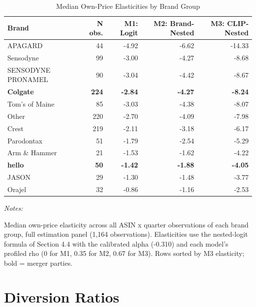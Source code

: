 \begin{table}[H]
\centering
\caption{\label{tab:table_brand_elas}Median Own-Price Elasticities by Brand Group}
\centering
\fontsize{9}{11}\selectfont
\begin{threeparttable}
\begin{tabular}[t]{lrrrr}
\toprule
Brand & N obs. & M1: Logit & M2: Brand-Nested & M3: CLIP-Nested\\
\midrule
APAGARD & 44 & -4.92 & -6.62 & -14.33\\
Sensodyne & 99 & -3.00 & -4.27 & -8.68\\
SENSODYNE PRONAMEL & 90 & -3.04 & -4.42 & -8.67\\
\textbf{Colgate} & \textbf{224} & \textbf{-2.84} & \textbf{-4.27} & \textbf{-8.24}\\
Tom's of Maine & 85 & -3.03 & -4.38 & -8.07\\
\addlinespace
Other & 220 & -2.70 & -4.09 & -7.98\\
Crest & 219 & -2.11 & -3.18 & -6.17\\
Parodontax & 51 & -1.79 & -2.54 & -5.29\\
Arm \& Hammer & 21 & -1.53 & -1.62 & -4.22\\
\textbf{hello} & \textbf{50} & \textbf{-1.42} & \textbf{-1.88} & \textbf{-4.05}\\
\addlinespace
JASON & 29 & -1.30 & -1.48 & -3.77\\
Orajel & 32 & -0.86 & -1.16 & -2.53\\
\bottomrule
\end{tabular}
\begin{tablenotes}
\item \textit{Notes: } 
\item Median own-price elasticity across all ASIN x quarter observations of each brand group, full estimation panel (1,164 observations). Elasticities use the nested-logit formula of Section 4.4 with the calibrated alpha (-0.310) and each model's profiled rho (0 for M1, 0.35 for M2, 0.67 for M3). Rows sorted by M3 elasticity; bold = merger parties.
\end{tablenotes}
\end{threeparttable}
\end{table}

\vspace{1em}

\section{Diversion Ratios}\label{diversion-ratios}

